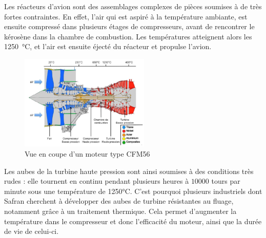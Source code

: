 
Les réacteurs d'avion sont des assemblages complexes de pièces soumises à de
très fortes contraintes. En effet, l'air qui est aspiré à la température 
ambiante, est ensuite compressé dans plusieurs étages de compresseurs, 
avant de rencontrer le kérosène dans la chambre de combustion. Les températures
atteignent alors les \SI{1250}{\celsius}, et l'air est ensuite éjecté du réacteur
et propulse l'avion.


\begin{figure}[H]
    \centering
    \includegraphics[width=0.55\textwidth]{images/coupe_CFM56.png}
    \caption{Vue en coupe d'un moteur type CFM56}
    \label{fig:CFM56}
\end{figure}


Les aubes de la turbine haute pression sont ainsi soumises à des conditions très rudes :
elle tournent en continu pendant plusieurs heures à $10000$ tours par minute sous une 
température de 1250°C. C'est pourquoi plusieurs industriels dont Safran cherchent à développer
des aubes de turbine résistantes au fluage, notamment grâce à un traitement thermique. 
Cela permet d'augmenter la température dans le compresseur et donc l'efficacité du moteur, 
ainsi que la durée de vie de celui-ci.


